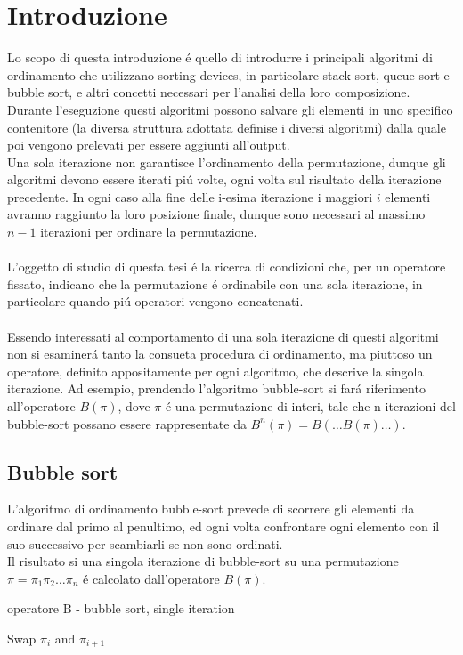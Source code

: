 \chapter{Introduzione}
Lo scopo di questa introduzione \'e quello di introdurre i principali algoritmi di ordinamento che utilizzano sorting devices, in particolare stack-sort,
queue-sort e bubble sort, e altri concetti necessari per l'analisi della loro composizione.\\Durante l'eseguzione questi algoritmi possono 
salvare gli elementi in uno specifico contenitore (la diversa struttura 
adottata definise i diversi algoritmi) dalla quale poi vengono prelevati
per essere aggiunti all'output.\\
Una sola iterazione non garantisce l'ordinamento della permutazione,
dunque gli algoritmi devono essere iterati pi\'u volte, ogni volta sul risultato della iterazione precedente. In ogni caso alla fine delle i-esima
iterazione i maggiori $i$ elementi avranno raggiunto la loro posizione finale, 
dunque sono necessari al massimo $n-1$ iterazioni per ordinare la permutazione.
\\\\L'oggetto di studio di questa tesi \'e la ricerca di condizioni che, per un
operatore fissato, indicano che la permutazione \'e ordinabile con una sola
iterazione, in particolare quando pi\'u operatori vengono concatenati.
\\\\
Essendo interessati al comportamento di una sola iterazione di questi
algoritmi non si esaminer\'a tanto la consueta procedura di ordinamento,
ma piuttoso un operatore, definito appositamente per ogni algoritmo, che
descrive la singola iterazione. 
Ad esempio, prendendo l'algoritmo bubble-sort si far\'a riferimento all'operatore $B(\pi)$, dove $\pi$ \'e una permutazione di
interi, tale che n iterazioni del bubble-sort possano essere rappresentate
da $B^n(\pi) = B(\dots B(\pi)\dots)$.
\section*{Bubble sort}
L'algoritmo di ordinamento bubble-sort prevede di scorrere gli elementi da 
ordinare dal primo al penultimo, ed ogni volta confrontare ogni elemento 
con il suo successivo per scambiarli se non sono ordinati.\\
Il risultato si una singola iterazione di bubble-sort su una permutazione $\pi=\pi_1\pi_2\dots\pi_n$ \'e calcolato dall'operatore $B(\pi)$.
\begin{algorithm}[H]
   \caption{operatore B - bubble sort, single iteration }
\begin{algorithmic}
   \State Swap $\pi_i$ and $\pi_{i+1}$
   \EndIf
   \EndFor
\end{algorithmic}
\end{algorithm}
